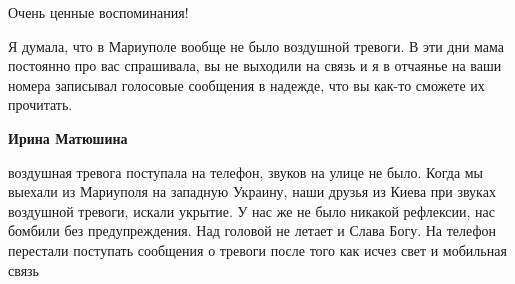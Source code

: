  
 
 
 
 

\qqSecCmt


Очень ценные воспоминания!


Я думала, что в Мариуполе вообще не было воздушной тревоги. В эти дни мама
постоянно про вас спрашивала, вы не выходили на связь и я в отчаянье на ваши
номера записывал голосовые сообщения в надежде, что вы как-то сможете их
прочитать.

\begin{itemize} %
\textbf{Ирина Матюшина} 

воздушная тревога поступала на телефон, звуков на улице не было. Когда мы
выехали из Мариуполя на западную Украину, наши друзья из Киева при звуках
воздушной тревоги, искали укрытие. У нас же не было никакой рефлексии, нас
бомбили без предупреждения. Над головой не летает и Слава Богу. На телефон
перестали поступать сообщения о тревоги после того как исчез свет и мобильная
связь

\end{itemize} %
